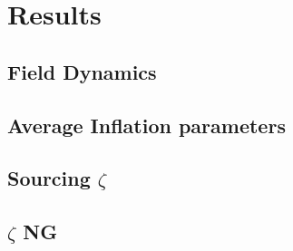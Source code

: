 
\section{Results} \label{sec:results}

\subsection{Field Dynamics}


\subsection{Average Inflation parameters}

\subsection{Sourcing $\zeta$}


\subsection{$\zeta$ NG}

